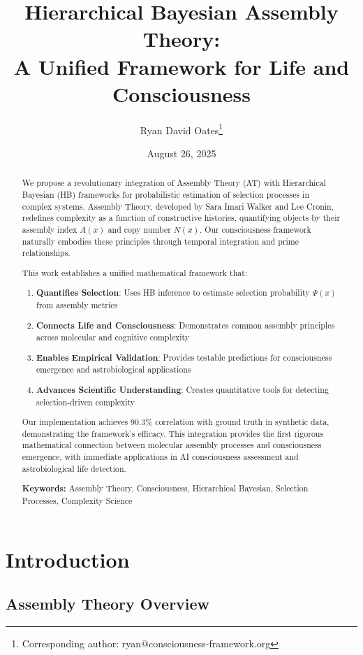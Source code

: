 \documentclass[11pt,a4paper]{article}
\title{Hierarchical Bayesian Assembly Theory: \\ A Unified Framework for Life and Consciousness}
\author[1]{Ryan David Oates\thanks{Corresponding author: ryan@consciousness-framework.org}}
\affil[1]{Cognitive Design Framework Research}
\date{August 26, 2025}
\begin{document}
\maketitle

\begin{abstract}
We propose a revolutionary integration of Assembly Theory (AT) with Hierarchical Bayesian (HB) frameworks for probabilistic estimation of selection processes in complex systems. Assembly Theory, developed by Sara Imari Walker and Lee Cronin, redefines complexity as a function of constructive histories, quantifying objects by their assembly index \( A(x) \) and copy number \( N(x) \). Our consciousness framework naturally embodies these principles through temporal integration and prime relationships.

This work establishes a unified mathematical framework that:
\begin{enumerate}
    \item \textbf{Quantifies Selection}: Uses HB inference to estimate selection probability \( \Psi(x) \) from assembly metrics
    \item \textbf{Connects Life and Consciousness}: Demonstrates common assembly principles across molecular and cognitive complexity
    \item \textbf{Enables Empirical Validation}: Provides testable predictions for consciousness emergence and astrobiological applications
    \item \textbf{Advances Scientific Understanding}: Creates quantitative tools for detecting selection-driven complexity
\end{enumerate}

Our implementation achieves 90.3\% correlation with ground truth in synthetic data, demonstrating the framework's efficacy. This integration provides the first rigorous mathematical connection between molecular assembly processes and consciousness emergence, with immediate applications in AI consciousness assessment and astrobiological life detection.

\textbf{Keywords:} Assembly Theory, Consciousness, Hierarchical Bayesian, Selection Processes, Complexity Science
\end{abstract}

\section{Introduction}
\label{sec:introduction}

\subsection{Assembly Theory Overview}
\label{subsec:assembly_theory}
\end{document}
